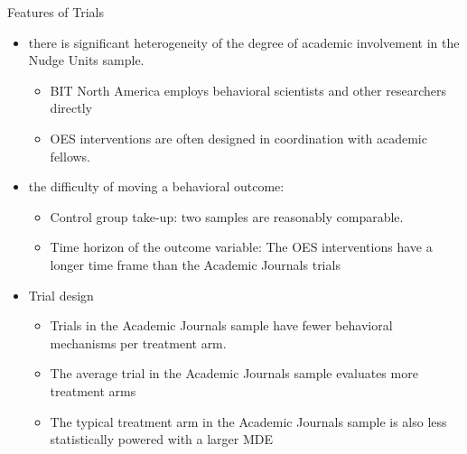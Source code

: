\documentclass[dvipdfmx,11pt]{beamer}
\begin{document}
\begin{frame}{}
  Features of Trials 
  \begin{itemize}
    \item there is significant heterogeneity of the degree of academic involvement in the Nudge Units sample.
    \begin{itemize}
      \item BIT North America employs behavioral scientists and other researchers directly
      \item OES interventions are often designed in coordination with academic fellows.
    \end{itemize}
    \item the difficulty of moving a behavioral outcome: 
    \begin{itemize}
      \item Control group take-up: two samples are reasonably comparable.
      \item Time horizon of the outcome variable: The OES interventions have a longer time frame than the Academic Journals trials
    \end{itemize}
    \item Trial design
    \begin{itemize}
      \item Trials in the Academic Journals sample have fewer behavioral mechanisms per treatment arm.
      \item The average trial in the Academic Journals sample evaluates more treatment arms
      \item The typical treatment arm in the Academic Journals sample is also less statistically powered with a larger MDE
    \end{itemize}
  \end{itemize}
\end{frame}
\end{document}
